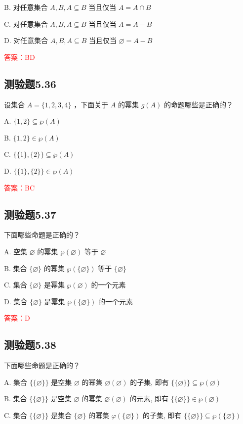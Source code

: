 \documentclass[UTF8, heading=true]{ctexart}
\begin{document}
B. 对任意集合 $A, B, A \subseteq B$ 当且仅当 $A=A \cap B$

C. 对任意集合 $A, B, A \subseteq B$ 当且仅当 $A=A-B$

D. 对任意集合 $A, B, A \subseteq B$ 当且仅当 $\varnothing=A-B$

\textcolor{red}{答案：BD}

\subsection{测验题5.36}

设集合 $A=\{1,2,3,4\}$ ，下面关于 $A$ 的幂集 $g(A)$ 的命题哪些是正确的？


A. $\{1,2\} \subseteq \wp(A) $

B. $\{1,2\} \in \wp(A) $

C. $\{\{1\},\{2\}\} \subseteq \wp(A) $

D. $\{\{1\},\{2\}\} \in \wp(A)$

\textcolor{red}{答案：BC}



\subsection{测验题5.37}

下面哪些命题是正确的？

A. 
空集 $\varnothing$ 的幂集 $\wp(\varnothing)$ 等于 $\varnothing$

B. 
集合 $\{\varnothing\}$ 的幂集 $\wp(\{\varnothing\})$ 等于 $\{\varnothing\}$

C. 
集合 $\{\varnothing\}$ 是幂集 $\wp(\varnothing)$ 的一个元素

D. 
集合 $\{\varnothing\}$ 是幂集 $\wp(\{\varnothing\})$ 的一个元素

\textcolor{red}{答案：D}

\subsection{测验题5.38}

下面哪些命题是正确的？

A. 
集合 $\{\{\varnothing\}\}$ 是空集 $\varnothing$ 的幂集 $\varnothing(\varnothing)$ 的子集, 即有 $\{\{\varnothing\}\} \subseteq \wp(\varnothing)$

B. 
集合 $\{\{\varnothing\}\}$ 是空集 $\varnothing$ 的幂集 $\varnothing(\varnothing)$ 的元素, 即有 $\{\{\varnothing\}\} \in \wp(\varnothing)$

C. 
集合 $\{\{\varnothing\}\}$ 是集合 $\{\varnothing\}$ 的幂集 $\varphi(\{\varnothing\})$ 的子集, 即有 $\{\{\varnothing\}\} \subseteq \wp(\{\varnothing\})$
\end{document}
